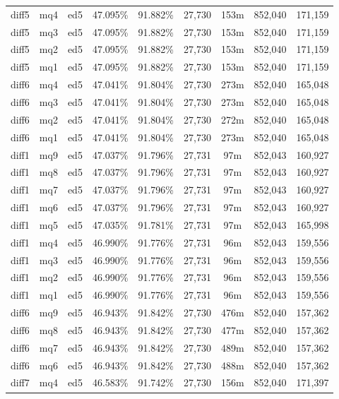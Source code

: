 \begin{landscape}
\begin{longtable}{|c|c|c||c|c||c|c|c|c|}
diff5 & mq4 & ed5 & 47.095\% & 91.882\% & 27,730 & 153m & 852,040 & 171,159 \\
diff5 & mq3 & ed5 & 47.095\% & 91.882\% & 27,730 & 153m & 852,040 & 171,159 \\
diff5 & mq2 & ed5 & 47.095\% & 91.882\% & 27,730 & 153m & 852,040 & 171,159 \\
diff5 & mq1 & ed5 & 47.095\% & 91.882\% & 27,730 & 153m & 852,040 & 171,159 \\
diff6 & mq4 & ed5 & 47.041\% & 91.804\% & 27,730 & 273m & 852,040 & 165,048 \\
diff6 & mq3 & ed5 & 47.041\% & 91.804\% & 27,730 & 273m & 852,040 & 165,048 \\
diff6 & mq2 & ed5 & 47.041\% & 91.804\% & 27,730 & 272m & 852,040 & 165,048 \\
diff6 & mq1 & ed5 & 47.041\% & 91.804\% & 27,730 & 273m & 852,040 & 165,048 \\
diff1 & mq9 & ed5 & 47.037\% & 91.796\% & 27,731 & 97m & 852,043 & 160,927 \\
diff1 & mq8 & ed5 & 47.037\% & 91.796\% & 27,731 & 97m & 852,043 & 160,927 \\
diff1 & mq7 & ed5 & 47.037\% & 91.796\% & 27,731 & 97m & 852,043 & 160,927 \\
diff1 & mq6 & ed5 & 47.037\% & 91.796\% & 27,731 & 97m & 852,043 & 160,927 \\
diff1 & mq5 & ed5 & 47.035\% & 91.781\% & 27,731 & 97m & 852,043 & 165,998 \\
diff1 & mq4 & ed5 & 46.990\% & 91.776\% & 27,731 & 96m & 852,043 & 159,556 \\
diff1 & mq3 & ed5 & 46.990\% & 91.776\% & 27,731 & 96m & 852,043 & 159,556 \\
diff1 & mq2 & ed5 & 46.990\% & 91.776\% & 27,731 & 96m & 852,043 & 159,556 \\
diff1 & mq1 & ed5 & 46.990\% & 91.776\% & 27,731 & 96m & 852,043 & 159,556 \\
diff6 & mq9 & ed5 & 46.943\% & 91.842\% & 27,730 & 476m & 852,040 & 157,362 \\
diff6 & mq8 & ed5 & 46.943\% & 91.842\% & 27,730 & 477m & 852,040 & 157,362 \\
diff6 & mq7 & ed5 & 46.943\% & 91.842\% & 27,730 & 489m & 852,040 & 157,362 \\
diff6 & mq6 & ed5 & 46.943\% & 91.842\% & 27,730 & 488m & 852,040 & 157,362 \\
diff7 & mq4 & ed5 & 46.583\% & 91.742\% & 27,730 & 156m & 852,040 & 171,397 \\

\end{longtable}
\end{landscape}
